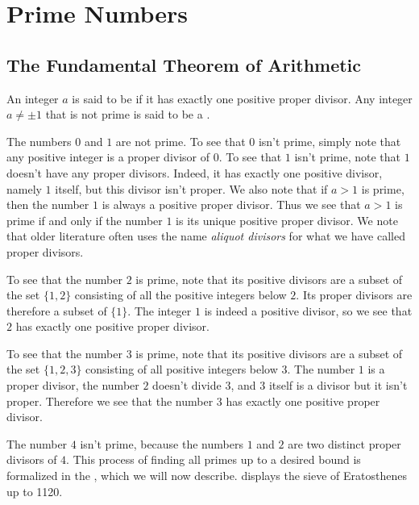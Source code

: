 \chapter{Prime Numbers}\label{chapter:fundamental-theorem-of-arithmetic}

\section{The Fundamental Theorem of Arithmetic}

\begin{definition}
  An integer $a$ is said to be  if it has exactly one positive proper divisor. Any integer $a\neq \pm 1$ that is not prime is said to be a .
\end{definition}

The numbers $0$ and $1$ are not prime. To see that $0$ isn't prime, simply note that any positive integer is a proper divisor of $0$. To see that $1$ isn't prime, note that $1$ doesn't have any proper divisors. Indeed, it has exactly one positive divisor, namely $1$ itself, but this divisor isn't proper. We also note that if $a>1$ is prime, then the number $1$ is always a positive proper divisor. Thus we see that $a>1$ is prime if and only if the number $1$ is its unique positive proper divisor. We note that older literature often uses the name \emph{aliquot divisors} for what we have called proper divisors.

To see that the number $2$ is prime, note that its positive divisors are a subset of the set $\{1,2\}$ consisting of all the positive integers below $2$. Its proper divisors are therefore a subset of $\{1\}$. The integer $1$ is indeed a positive divisor, so we see that $2$ has exactly one positive proper divisor.

To see that the number $3$ is prime, note that its positive divisors are a subset of the set $\{1,2,3\}$ consisting of all positive integers below $3$. The number $1$ is a proper divisor, the number $2$ doesn't divide $3$, and $3$ itself is a divisor but it isn't proper. Therefore we see that the number $3$ has exactly one positive proper divisor.

The number $4$ isn't prime, because the numbers $1$ and $2$ are two distinct proper divisors of $4$. This process of finding all primes up to a desired bound is formalized in the , which we will now describe.  displays the sieve of Eratosthenes up to 1120.

